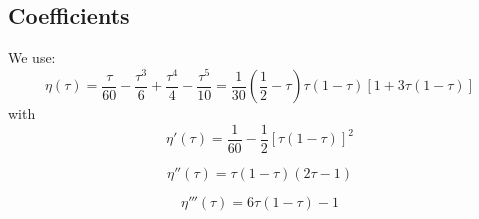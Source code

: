 \documentclass[aps,12pt]{revtex4}
\begin{document}
\subsection{Coefficients}
We use:
\begin{equation}
	\eta(\tau) = \dfrac{\tau}{60} - \dfrac{\tau^3}{6} + \dfrac{\tau^4}{4} - \dfrac{\tau^5}{10}
	 = \dfrac{1}{30} \left(\dfrac{1}{2} - \tau \right)\tau (1-\tau) \left[ 1 + 3 \tau(1-\tau) \right]
\end{equation}
with
\begin{equation}
\eta'(\tau) = \dfrac{1}{60} - \dfrac{1}{2} \left[ \tau(1-\tau) \right]^2
\end{equation}

\begin{equation}
\eta''(\tau) =  \tau(1-\tau)(2\tau-1)
\end{equation}

\begin{equation}
\eta'''(\tau) =  6\tau(1-\tau)-1
\end{equation}
\end{document}
